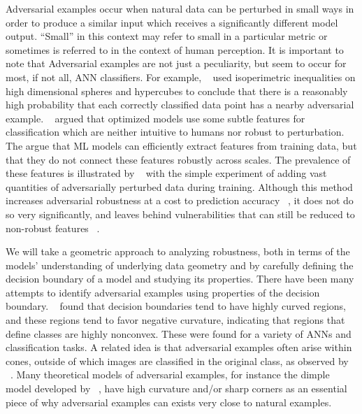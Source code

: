 Adversarial examples occur when natural data can be perturbed in small
ways in order to produce a similar input which receives a
significantly different model output. ``Small'' in this context may
refer to small in a particular metric or sometimes is referred to in
the context of human perception. It is important to note that Adversarial
examples are not just a peculiarity, but seem to occur for most, if
not all, ANN  classifiers. For example, ~\citet{inevitable2018} used
isoperimetric inequalities on high dimensional spheres and hypercubes
to conclude that there is a reasonably high probability that each
correctly classified data point has a nearby adversarial
example. ~\citet{ilyas2019adversarial} argued that optimized models use
some subtle features for classification which are neither intuitive to
humans nor robust to perturbation. The argue that ML models can
efficiently extract features from training data, but that they do not
connect these features robustly across scales. The prevalence of these
features is illustrated by ~\citet{madry2018towards} with the simple experiment of adding vast
quantities of adversarially perturbed data during training. Although
this method increases adversarial robustness at a cost to prediction
accuracy ~\citep{tsipras2018robustness}, it does not do so very
significantly, and leaves behind vulnerabilities that can still be
reduced to non-robust features ~\citep{inevitable2018}.  


We will take a geometric approach to analyzing 
robustness, both in terms of the models' understanding of underlying
data geometry and by carefully defining the decision boundary of a
model and studying its properties. There have been many
attempts to identify adversarial examples using properties of the
decision boundary.  ~\citet{Fawzi2018empirical} found that decision
boundaries tend to have highly curved regions, and these regions tend
to favor negative curvature, indicating that regions that define
classes are highly nonconvex. These were found for a variety of ANNs
and classification  tasks. 
A related idea is that adversarial examples often arise within cones, outside of which images are classified in the original class, as observed by ~\citet{roth19aodds}. Many theoretical models of adversarial examples, for instance the dimple model developed by ~\citet{shamir2021}, have high curvature and/or sharp corners as an essential piece of why adversarial examples can exists very close to natural examples.



